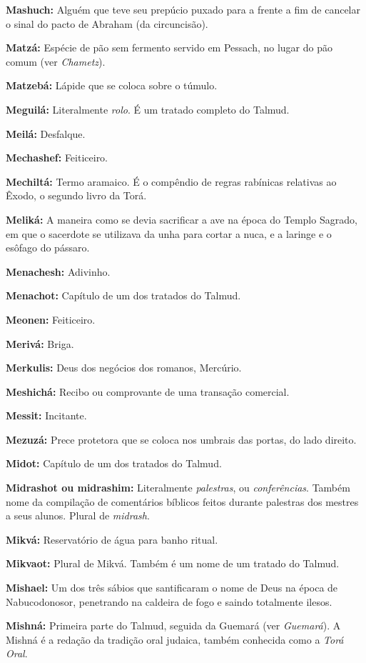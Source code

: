 \begin{hangparas}{.25in}{1}
{\textbf{Mashuch:} Alguém que teve seu prepúcio puxado para a
frente a fim de cancelar o sinal do pacto de Abraham (da circuncisão).

\textbf{Matzá:} Espécie de pão sem fermento servido em Pessach, no lugar do pão
comum (ver \emph{Chametz}).

\textbf{Matzebá:} Lápide que se coloca sobre o túmulo.

\textbf{Meguilá:} Literalmente \emph{rolo}. É um tratado completo do Talmud.

\textbf{Meilá:} Desfalque.

\textbf{Mechashef:} Feiticeiro.

\textbf{Mechiltá:} Termo aramaico. É o compêndio de regras rabínicas relativas ao Êxodo, o
segundo livro da Torá.

\textbf{Meliká:} A maneira como se devia sacrificar a ave na época do Templo Sagrado, em que o sacerdote se utilizava da unha para cortar a nuca, e a laringe e o esôfago do pássaro.

\textbf{Menachesh:} Adivinho.

\textbf{Menachot:} Capítulo de um dos tratados do Talmud.

\textbf{Meonen:} Feiticeiro.

\textbf{Merivá:} Briga.

\textbf{Merkulis:} Deus dos negócios dos romanos, Mercúrio.

\textbf{Meshichá:} Recibo ou comprovante de uma transação comercial.

\textbf{Messit:} Incitante.

\textbf{Mezuzá:} Prece protetora que se coloca nos umbrais das portas,
do lado direito.

\textbf{Midot:} Capítulo de um dos tratados do Talmud.

\textbf{Midrashot ou midrashim:} Literalmente \emph{palestras}, ou 
\emph{conferências}. 
Também nome da compilação de comentários bíblicos feitos
durante palestras dos mestres a seus alunos. Plural de \emph{midrash}.

\textbf{Mikvá:} Reservatório de água para banho ritual.

\textbf{Mikvaot:} Plural de Mikvá. Também é um nome de um tratado do Talmud.

\textbf{Mishael:} Um dos três sábios que santificaram o nome de Deus na
época de Nabucodonosor, penetrando na caldeira de fogo e saindo
totalmente ilesos.

\textbf{Mishná:} Primeira parte do Talmud, seguida da Guemará 
(ver \emph{Guemará}). A Mishná
é a redação da tradição oral judaica, também conhecida como a \emph{Torá Oral}.

}
\end{hangparas}
